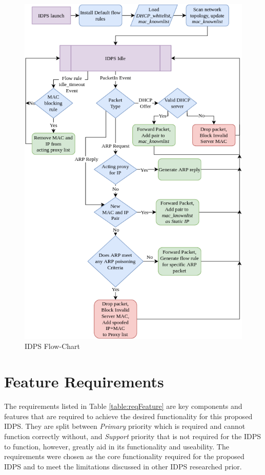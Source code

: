 \documentclass[12pt, oneside]{book}
\begin{document}
\begin{figure}[H]
	\centering
	\includegraphics[scale=0.67]{images/IDPSflow.png}
	\caption{IDPS Flow-Chart}
	\label{fig:idpsflow}
\end{figure}

\newpage
\section{Feature Requirements}
The requirements listed in Table \ref{table:reqFeature} are key components and features that are required
to achieve the desired functionality for this proposed IDPS. They are split between \emph{Primary}
priority which is required and cannot function correctly without, and \emph{Support} priority that 
is not required for the IDPS to function, however, greatly aid in its functionality and useability.
The requirements were chosen as the core functionality required for the proposed IDPS and to meet 
the limitations discussed in other IDPS researched prior.
\end{document}
